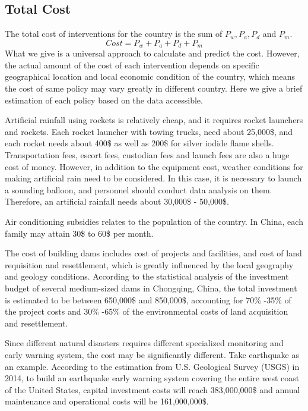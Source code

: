 \documentclass{mcmthesis}
\begin{document}
	\subsection{Total Cost}
	The total cost of interventions for the country is the sum of $P_w, P_a, P_d$ and $P_m$.
	$$
	Cost = P_w + P_a + P_d + P_m
	$$
	What we give is a universal approach to calculate and predict the cost. However, the actual amount of the cost of each intervention depends on specific geographical location and local economic condition of the country, which means the cost of same policy may vary greatly in different country. Here we give a brief estimation of each policy based on the data accessible.
	
	Artificial rainfall using rockets is relatively cheap, and it requires rocket launchers and rockets. Each rocket launcher with towing trucks, need about 25,000\$, and each rocket needs about 400\$ as well as 200\$ for silver iodide flame shells. Transportation fees, escort fees, custodian fees and launch fees are also a huge cost of money. However, in addition to the equipment cost, weather conditions for making artificial rain need to be considered. In this case, it is necessary to launch a sounding balloon, and personnel should conduct data analysis on them. Therefore, an artificial rainfall needs about 30,000\$ - 50,000\$.
	
	Air conditioning subsidies relates to the population of the country. In China, each family may attain 30\$ to 60\$ per month.
	
	The cost of building dams includes cost of projects and facilities, and cost of land requisition and resettlement, which is greatly influenced by the local geography and geology conditions. According to the statistical analysis of the investment budget of several medium-sized dams in Chongqing, China, the total investment is estimated to be between 650,000\$ and 850,000\$, accounting for 70\% -35\% of the project costs and 30\% -65\% of the environmental costs of land acquisition and resettlement.
	
	Since different natural disasters requires different specialized monitoring and early warning system, the cost may be significantly different. Take earthquake as an example. According to the estimation from U.S. Geological Survey (USGS) in 2014, to build an earthquake early warning system covering the entire west coast of the United States, capital investment costs will reach 383,000,000\$ and annual maintenance and operational costs will be 161,000,000\$.
  
\end{document}
